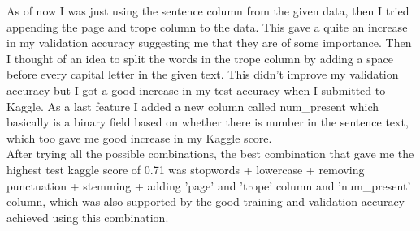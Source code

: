 \documentclass{article}
\begin{document}
As of now I was just using the sentence column from the given data, then I tried appending the page and trope column to the data. This gave a quite an increase in my validation accuracy suggesting me that they are of some importance. Then I thought of an idea to split the words in the trope column by adding a space before every capital letter in the given text. This didn't improve my validation accuracy but I got a good increase in my test accuracy when I submitted to Kaggle. As a last feature I added a new column called num\_present which basically is a binary field based on whether there is number in the sentence text, which too gave me good increase in my Kaggle score.\\

After trying all the possible combinations, the best combination that gave me the highest test kaggle score of 0.71 was stopwords + lowercase + removing punctuation + stemming + adding 'page' and 'trope' column and 'num\_present' column, which was also supported by the good training and validation accuracy achieved using this combination.
 
\end{document}
